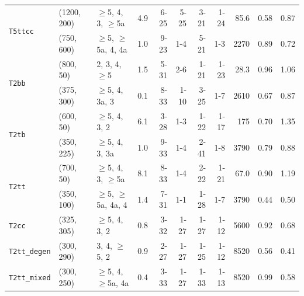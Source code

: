 \begin{table}[!t]
{\begin{tabular}{ lllcrrrrrcc }
      \multirow{2}{*}{\texttt{T5ttcc}}  
    & (1200, 200) & $\geq$5, 4, 3, $\geq$5a  & \phantom{1}4.9 & 6-25  & 5-25    & 3-21  & 1-24 & 85.6 & 0.58 & 0.87 \\
    & (750, 600)  & $\geq$5, $\geq$5a, 4, 4a & \phantom{1}1.0 & 9-23  & 1-4     & 5-21  & 1-3  & 2270 & 0.89 & 0.72 \\ [0.5ex]
      \multirow{2}{*}{\texttt{T2bb}}
    & (800, 50)   & 2, 3, 4, $\geq$5         & \phantom{1}1.5 & 5-31  & 2-6     & 1-21  & 1-23 & 28.3 & 0.96 & 1.06 \\
    & (375, 300)  & $\geq$5, 4, 3a, 3        & \phantom{1}0.1 & 8-33  & 1-10    & 3-25  & 1-7  & 2610 & 0.67 & 0.87 \\ [0.5ex]
      \multirow{2}{*}{\texttt{T2tb}}
    & (600, 50)   & $\geq$5, 4, 3, 2         & \phantom{1}6.1 & 3-28  & 1-3     & 1-22  & 1-17 & 175  & 0.70 & 1.35 \\
    & (350, 225)  & $\geq$5, 4, 3, 3a        & \phantom{1}1.0 & 9-33  & 1-4     & 2-41  & 1-8  & 3790 & 0.79 & 0.88 \\ [0.5ex]
      \multirow{2}{*}{\texttt{T2tt}}
    & (700, 50)   & $\geq$5, 4, 3, $\geq$5a  & \phantom{1}8.1 & 8-33  & 1-4     & 2-22  & 1-21 & 67.0 & 0.90 & 1.19 \\
    & (350, 100)  & $\geq$5, $\geq$5a, 4a, 4 & \phantom{1}1.4 & 7-31  & 1-1     & 1-28  & 1-7  & 3790 & 0.44 & 0.50 \\ [0.5ex]
      \multirow{1}{*}{\texttt{T2cc}}
    & (325, 305)  & $\geq$5, 4, 3, 2         & \phantom{1}0.8 & 3-32  & 1-27    & 1-27  & 1-12 & 5600 & 0.92 & 0.68 \\ [0.5ex]
      \multirow{1}{*}{\texttt{T2tt\_degen}}
    & (300, 290)  & 3, 4, $\geq$5, 2         & \phantom{1}0.9 & 2-27  & 1-27    & 1-25  & 1-12 & 8520 & 0.56 & 0.41 \\ [0.5ex]
      \multirow{1}{*}{\texttt{T2tt\_mixed}}
    & (300, 250)  & $\geq$5, 4, $\geq$5a, 4a & \phantom{1}0.4 & 3-33  & 1-27    & 1-33  & 1-13 & 8520 & 0.99 & 0.58 \\ [0.5ex]
      \hline
    \end{tabular}
  }
\end{table}

